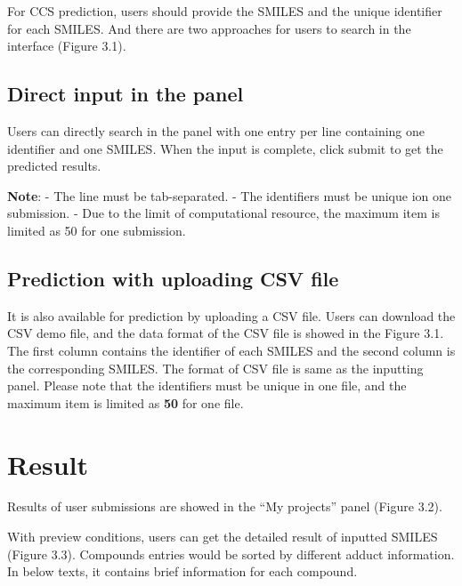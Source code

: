 \documentclass[12pt,]{book}
\theoremstyle{definition}
\theoremstyle{definition}
\theoremstyle{definition}
\theoremstyle{remark}
\begin{document}
For CCS prediction, users should provide the SMILES and the unique
identifier for each SMILES. And there are two approaches for users to
search in the interface (Figure 3.1).

\subsection{Direct input in the panel}\label{direct-input-in-the-panel}

Users can directly search in the panel with one entry per line
containing one identifier and one SMILES. When the input is complete,
click submit to get the predicted results.

\textbf{Note}: - The line must be tab-separated. - The identifiers must
be unique ion one submission. - Due to the limit of computational
resource, the maximum item is limited as 50 for one submission.

\subsection{Prediction with uploading CSV
file}\label{prediction-with-uploading-csv-file}

It is also available for prediction by uploading a CSV file. Users can
download the CSV demo file, and the data format of the CSV file is
showed in the Figure 3.1. The first column contains the identifier of
each SMILES and the second column is the corresponding SMILES. The
format of CSV file is same as the inputting panel. Please note that the
identifiers must be unique in one file, and the maximum item is limited
as \textbf{50} for one file.

\section{Result}\label{result}

Results of user submissions are showed in the ``My projects'' panel
(Figure 3.2).

With preview conditions, users can get the detailed result of inputted
SMILES (Figure 3.3). Compounds entries would be sorted by different
adduct information. In below texts, it contains brief information for
each compound.
\end{document}
